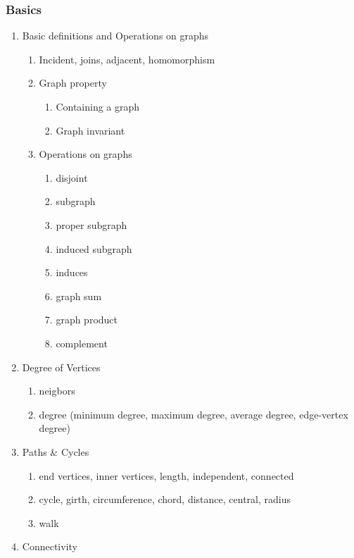 \documentclass{article}
\begin{document}
\subsubsection*{Basics}
\begin{enumerate}
    \item Basic definitions and Operations on graphs
    \begin{enumerate}
        \item Incident, joins, adjacent, homomorphism
        \item Graph property
        \begin{enumerate}
            \item Containing a graph 
            \item Graph invariant
        \end{enumerate}
        \item Operations on graphs
        \begin{enumerate}
            \item disjoint
            \item subgraph
            \item proper subgraph
            \item induced subgraph
            \item induces
            \item graph sum
            \item graph product
            \item complement
        \end{enumerate}
    \end{enumerate}
    \item Degree of Vertices
    \begin{enumerate}
        \item neigbors
        \item degree (minimum degree, maximum degree, average degree, edge-vertex degree)
    \end{enumerate}
    \item Paths \& Cycles
    \begin{enumerate}
        \item end vertices, inner vertices, length, independent, connected
        \item cycle, girth, circumference, chord, distance, central, radius
        \item walk
    \end{enumerate}
    \item Connectivity
    \begin{enumerate}

\end{enumerate}
\end{enumerate}
\end{document}
